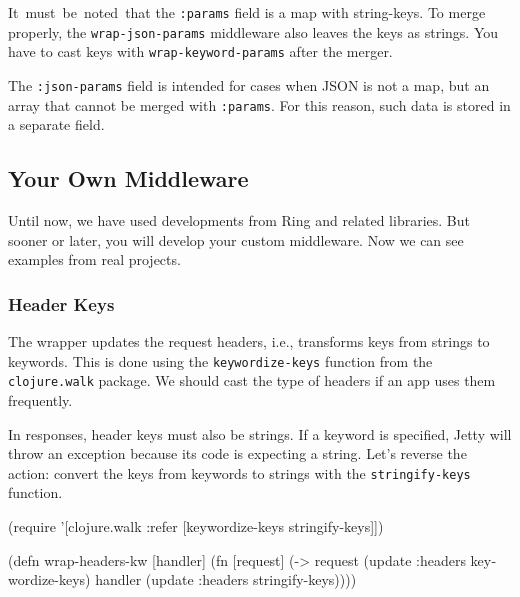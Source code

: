 
It must be noted that the \verb|:params| field is a map with string-keys. To merge properly, the \verb|wrap-json-params| middleware also leaves the keys as strings. You have to cast keys with \verb|wrap-keyword-params| after the merger.

The \verb|:json-params| field is intended for cases when JSON is not a map, but an array that cannot be merged with \verb|:params|. For this reason, such data is stored in a separate field.

\subsection{Your Own Middleware}


Until now, we have used developments from Ring and related libraries. But sooner or later, you will develop your custom middleware. Now we can see examples from real projects.

\subsubsection*{Header Keys}


The wrapper updates the request headers, i.e., transforms keys from strings to keywords. This is done using the \verb|keywordize-keys| function from the \verb|clojure.walk| package. We should cast the type of headers if an app uses them frequently.


In responses, header keys must also be strings. If a keyword is specified, Jetty will throw an exception because its code is expecting a string. Let's reverse the action: convert the keys from keywords to strings with the \verb|stringify-keys| function.


\ifx\DEVICETYPE\MOBILE

\begin{english}
  \begin{clojure}
(require
 '[clojure.walk :refer [keywordize-keys
                        stringify-keys]])

(defn wrap-headers-kw [handler]
  (fn [request]
    (-> request
        (update :headers keywordize-keys)
        handler
        (update :headers
                stringify-keys))))
  \end{clojure}
\end{english}

